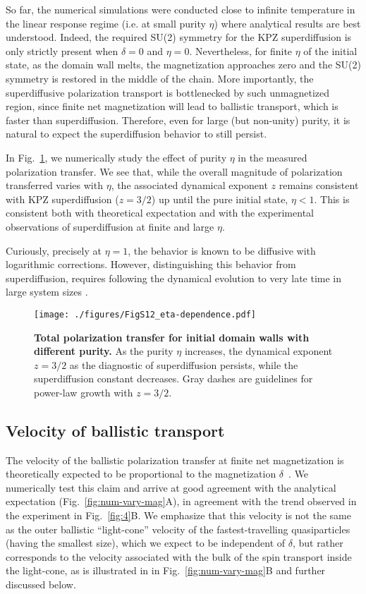 \documentclass[
 reprint,
 superscriptaddress,
 amsmath,amssymb,
 aps,
 pra,
]{revtex4-2}
\begin{document}
So far, the numerical simulations were conducted close to infinite temperature in the linear response regime (i.e. at small purity $\eta$) where analytical results are best understood. 
Indeed, the required SU(2) symmetry for the KPZ superdiffusion is only strictly present when $\delta=0$ and $\eta=0$. 
Nevertheless, for finite $\eta$ of the initial state, as the domain wall melts, the magnetization approaches zero and the SU(2) symmetry is restored in the middle of the chain. 
More importantly, the superdiffusive polarization transport is bottlenecked by such unmagnetized region, since finite net magnetization will lead to ballistic transport, which is faster than superdiffusion. Therefore, even for large (but non-unity) purity, it is natural to expect the superdiffusion behavior to still persist. 

In Fig.~\ref{fig:num-vary-eta}, we numerically study the effect of purity $\eta$ in the measured polarization transfer. We see that, while the overall magnitude of polarization transferred varies with $\eta$, the associated dynamical exponent $z$ remains consistent with KPZ superdiffusion ($z=3/2$) up until the pure initial state, $\eta < 1$. This is consistent both with theoretical expectation and with the experimental observations of superdiffusion at finite and large $\eta$. 

Curiously, precisely at $\eta = 1$, the behavior is known to be diffusive with logarithmic corrections. However, distinguishing this behavior from superdiffusion, requires following the dynamical evolution to very late time in large system sizes \cite{Ljubotina2017,Misguich2017,Ye2020}.

\begin{figure}[t!]
    \centering
    \texttt{[image: ./figures/FigS12\_eta-dependence.pdf]}
    \caption{\textbf{Total polarization transfer for initial domain walls with different purity.}
        As the purity $\eta$ increases, the dynamical exponent $z=3/2$ as the diagnostic of superdiffusion persists, while the superdiffusion constant decreases. 
        Gray dashes are guidelines for power-law growth with $z=3/2$. 
    }
    \label{fig:num-vary-eta}
\end{figure}


\subsection{Velocity of ballistic transport}

The velocity of the ballistic polarization transfer at finite net magnetization is theoretically expected to be proportional to the magnetization $\delta$~\cite{Gopalakrishnan2019a}. We numerically test this claim and arrive at good agreement with the analytical expectation (Fig.~\ref{fig:num-vary-mag}A), in agreement with the trend observed in the experiment in Fig.~\ref{fig:4}B. We emphasize that this velocity is not the same as the outer ballistic ``light-cone'' velocity of the fastest-travelling quasiparticles (having the smallest size), which we expect to be independent of $\delta$, but rather corresponds to the velocity associated with the bulk of the spin transport inside the light-cone, as is illustrated in in Fig.~\ref{fig:num-vary-mag}B and further discussed below.
\end{document}
